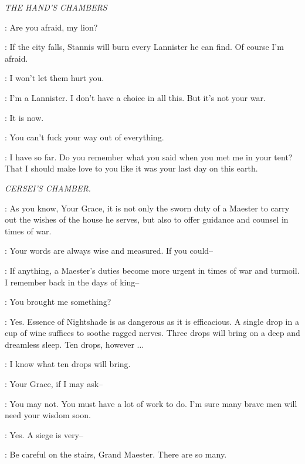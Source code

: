 \textit{THE HAND'S CHAMBERS}


\SHAE: Are you afraid, my lion? 

\TYRION: If the city falls, Stannis will burn every Lannister he can find. Of course I'm afraid. 

\SHAE: I won't let them hurt you. 

\TYRION: I'm a Lannister. I don't have a choice in all this. But it's not your war. 

\SHAE: It is now.


\TYRION: You can't fuck your way out of everything. 

\SHAE: I have so far. Do you remember what you said when you met me in your tent? That I should make love to you like it was your last day on this
earth.



\scene

\textit{CERSEI'S CHAMBER.}


\PYCELLE: As you know, Your Grace, it is not only the sworn duty of a Maester to carry out the wishes of the house he serves, but also to offer guidance and counsel in times of war. 

\CERSEI: Your words are always wise and measured. If you could--  

\PYCELLE: If anything, a Maester's duties become more urgent in times of war and turmoil. I remember back in the days of king--  

\CERSEI: You brought me something? 

\PYCELLE: Yes.  Essence of Nightshade is as dangerous as it is efficacious. A single drop in a cup of wine suffices to soothe ragged nerves. Three drops will bring on a deep and dreamless sleep. 
Ten drops, however $\ldots$  

\CERSEI: I know what ten drops will bring. 

\PYCELLE: Your Grace, if I may ask--  

\CERSEI: You may not. You must have a lot of work to do. I'm sure many brave men will need your wisdom soon. 

\PYCELLE: Yes. A siege is very--  

\CERSEI: Be careful on the stairs, Grand Maester. There are so many. 

